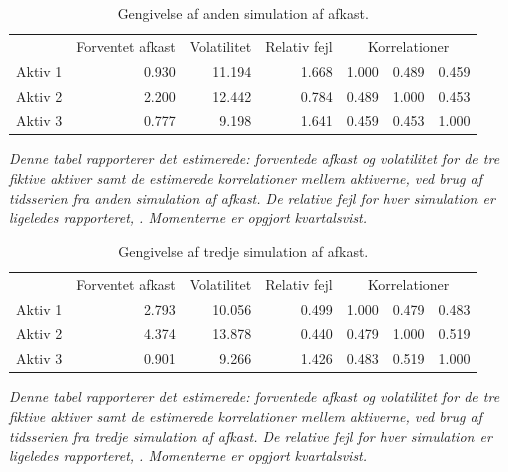 \documentclass[
  a4paper,
  oneside]{memoir}
\begin{document}
\begin{table}[H]

\caption{\label{tab:sim2}Gengivelse af anden simulation af afkast.}
\centering
\begin{threeparttable}
\begin{tabular}[t]{lrrrrrr}
\toprule
\multicolumn{1}{c}{ } & \multicolumn{1}{c}{Forventet afkast} & \multicolumn{1}{c}{Volatilitet} & \multicolumn{1}{c}{Relativ fejl} & \multicolumn{3}{c}{Korrelationer} \\
\cmidrule(l{3pt}r{3pt}){2-2} \cmidrule(l{3pt}r{3pt}){3-3} \cmidrule(l{3pt}r{3pt}){4-4} \cmidrule(l{3pt}r{3pt}){5-7}
\rowcolor{gray!6}  Aktiv 1 & 0.930 & 11.194 & 1.668 & 1.000 & 0.489 & 0.459\\
Aktiv 2 & 2.200 & 12.442 & 0.784 & 0.489 & 1.000 & 0.453\\
\rowcolor{gray!6}  Aktiv 3 & 0.777 & 9.198 & 1.641 & 0.459 & 0.453 & 1.000\\
\bottomrule
\end{tabular}
\begin{tablenotes}
\item \textit{Denne tabel rapporterer det estimerede: forventede afkast og volatilitet for de tre fiktive aktiver samt de estimerede korrelationer mellem aktiverne, ved brug af tidsserien fra anden simulation af afkast. De relative fejl for hver simulation er ligeledes rapporteret, \citep{Asmussen2007}. Momenterne er opgjort kvartalsvist.}
\end{tablenotes}
\end{threeparttable}
\end{table}

\begin{table}[H]

\caption{\label{tab:sim3}Gengivelse af tredje simulation af afkast.}
\centering
\begin{threeparttable}
\begin{tabular}[t]{lrrrrrr}
\toprule
\multicolumn{1}{c}{ } & \multicolumn{1}{c}{Forventet afkast} & \multicolumn{1}{c}{Volatilitet} & \multicolumn{1}{c}{Relativ fejl} & \multicolumn{3}{c}{Korrelationer} \\
\cmidrule(l{3pt}r{3pt}){2-2} \cmidrule(l{3pt}r{3pt}){3-3} \cmidrule(l{3pt}r{3pt}){4-4} \cmidrule(l{3pt}r{3pt}){5-7}
\rowcolor{gray!6}  Aktiv 1 & 2.793 & 10.056 & 0.499 & 1.000 & 0.479 & 0.483\\
Aktiv 2 & 4.374 & 13.878 & 0.440 & 0.479 & 1.000 & 0.519\\
\rowcolor{gray!6}  Aktiv 3 & 0.901 & 9.266 & 1.426 & 0.483 & 0.519 & 1.000\\
\bottomrule
\end{tabular}
\begin{tablenotes}
\item \textit{Denne tabel rapporterer det estimerede: forventede afkast og volatilitet for de tre fiktive aktiver samt de estimerede korrelationer mellem aktiverne, ved brug af tidsserien fra tredje simulation af afkast. De relative fejl for hver simulation er ligeledes rapporteret, \citep{Asmussen2007}. Momenterne er opgjort kvartalsvist.}
\end{tablenotes}
\end{threeparttable}
\end{table}
\end{document}
